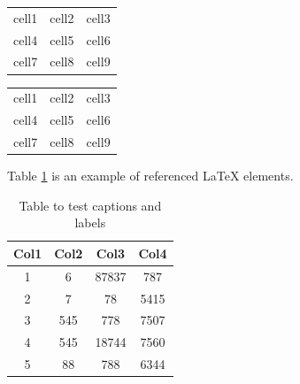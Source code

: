 \documentclass{report}
\begin{document}
\begin{center}
    \begin{tabular}{ c c c }
        cell1 & cell2 & cell3 \\
        cell4 & cell5 & cell6 \\
        cell7 & cell8 & cell9    
    \end{tabular}    
\end{center}

\begin{center}
    \begin{tabular}{ |c|c|c| }
        \hline
        cell1 & cell2 & cell3 \\
        cell4 & cell5 & cell6 \\
        cell7 & cell8 & cell9 \\
        \hline    
    \end{tabular}    
\end{center}

Table \ref{table:data} is an example of referenced \LaTeX{} elements.

\begin{table}[h!]
    \centering
    \begin{tabular}{||c c c c||}
        \hline
        Col1 & Col2 & Col3 & Col4 \\ [0.5ex]
        \hline\hline
        1 & 6 & 87837 & 787 \\
        \hline
        2 & 7 & 78 & 5415 \\
        \hline
        3 & 545 & 778 & 7507 \\
        \hline
        4 & 545 & 18744 & 7560 \\
        \hline
        5 & 88 & 788 & 6344 \\ [1ex]
        \hline        
    \end{tabular}
    \caption{Table to test captions and labels}
    \label{table:data}    
\end{table}
\end{document}
